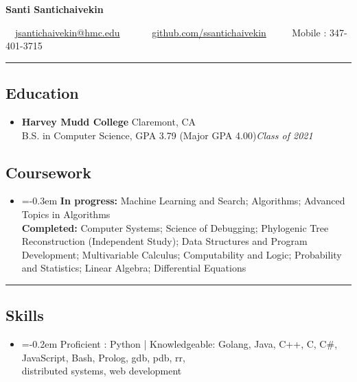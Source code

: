 \documentclass[10.5pt,letterpaper]{article}
\begin{document}
\begin{center}
{\Large \textbf{Santi Santichaivekin}}

\ \ \href{mailto:jsantichaivekin@hmc.edu}{jsantichaivekin@hmc.edu}\ \ 
\ \ \textbullet
\ \ \href{https://github.com/ssantichaivekin}{github.com/ssantichaivekin}
\ \ \textbullet
\ \ Mobile : 347-401-3715

\end{center}


\hrule
\vspace{-0.95em}
\subsection*{Education}
  \begin{itemize}
    \parskip=-0.5em

    \item[]
    \textbf{Harvey Mudd College} \hfill
      Claremont, CA\\
    {B.S. in Computer Science, GPA 3.79 (Major GPA 4.00)\hfill \emph{Class of 2021}}
  \end{itemize}
  \vspace{-2.07em}
\subsection*{Coursework}
\begin{itemize}
\item[]
    \parskip=-0.3em
  \textbf{In progress:} Machine Learning and Search; Algorithms; Advanced Topics in Algorithms \\
  \textbf{Completed:} Computer Systems;
  Science of Debugging;
  Phylogenic Tree Reconstruction (Independent Study);
  Data Structures and Program Development; 
  Multivariable Calculus;
  Computability and Logic; 
  Probability and Statistics;
  Linear Algebra;
  Differential Equations

\end{itemize}

\hrule
\vspace{-0.95em}
\subsection*{Skills}
\begin{itemize}
\item[]
    \parskip=-0.2em
  Proficient : Python | Knowledgeable: Golang, Java, C++, C, C\#, JavaScript, Bash, Prolog, gdb, pdb, rr,\\
  distributed systems, web development
    
\end{itemize}
\end{document}

